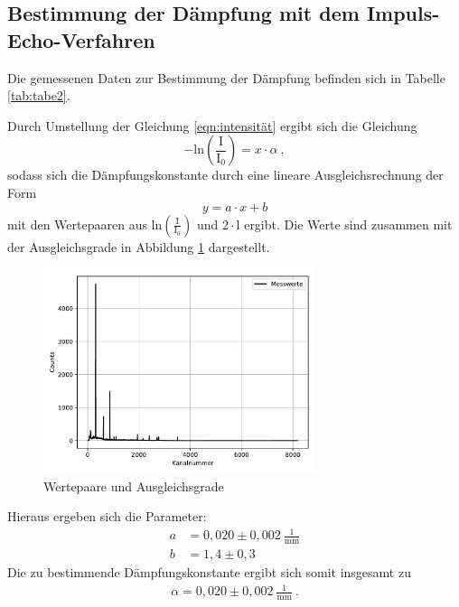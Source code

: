 \subsection{Bestimmung der Dämpfung mit dem Impuls-Echo-Verfahren}
Die gemessenen Daten zur Bestimmung der Dämpfung befinden sich in Tabelle
\ref{tab:tabe2}.

Durch Umstellung der Gleichung \ref{eqn:intensität} ergibt sich die Gleichung
\begin{equation}
  - \text{ln}(\frac{\text{I}}{\text{I}_0})= x \cdot \alpha \: ,
\end{equation}
sodass sich die Dämpfungskonstante durch eine lineare Ausgleichsrechnung der Form
\begin{equation}
  y = a\cdot x +b
  \label{eqn:linear}
\end{equation}
mit den Wertepaaren aus $\text{ln}(\frac{\text{I}}{\text{I}_0})$ und $2 \cdot$l
ergibt. Die Werte sind zusammen mit der Ausgleichsgrade in Abbildung \ref{fig:plot1}
dargestellt.
\begin{figure}[H]
  \centering
  \includegraphics[height=6cm]{plot1.pdf}
  \caption{Wertepaare und Ausgleichsgrade}
  \label{fig:plot1}
\end{figure}
Hieraus ergeben sich die Parameter:
\begin{align*}
  a &= 0,020 \pm 0,002 \: \frac{1}{\text{mm}} \\
  b &= 1,4 \pm 0,3
\end{align*}
Die zu bestimmende Dämpfungskonstante ergibt sich somit insgesamt zu
\begin{align*}
  \alpha = 0,020 \pm 0,002 \: \frac{1}{\text{mm}} \: .
\end{align*}

